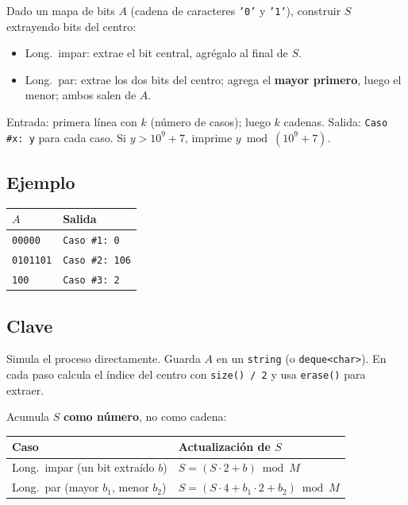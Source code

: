 \documentclass[12pt, oneside]{article}
\begin{document}
Dado un mapa de bits $A$ (cadena de caracteres \texttt{'0'} y \texttt{'1'}),
construir $S$ extrayendo bits del centro:

\begin{itemize}
  \item Long.\ impar: extrae el bit central, agrégalo al final de $S$.
  \item Long.\ par: extrae los dos bits del centro; agrega el \textbf{mayor
        primero}, luego el menor; ambos salen de $A$.
\end{itemize}

Entrada: primera línea con $k$ (número de casos); luego $k$ cadenas.
Salida: \texttt{Caso \#x: y} para cada caso.  Si $y > 10^9+7$, imprime
$y \bmod (10^9+7)$.

\subsection{Ejemplo}

\begin{center}
\begin{tabular}{ll}
  \toprule
  $A$ & Salida \\
  \midrule
  \texttt{00000}   & \texttt{Caso \#1: 0} \\
  \texttt{0101101} & \texttt{Caso \#2: 106} \\
  \texttt{100}     & \texttt{Caso \#3: 2} \\
  \bottomrule
\end{tabular}
\end{center}

\subsection{Clave}

Simula el proceso directamente.  Guarda $A$ en un \texttt{string} (o
\texttt{deque<char>}).  En cada paso calcula el índice del centro con
\texttt{size() / 2} y usa \texttt{erase()} para extraer.

Acumula $S$ \textbf{como número}, no como cadena:

\begin{center}
\begin{tabular}{ll}
  \toprule
  \textbf{Caso} & \textbf{Actualización de $S$} \\
  \midrule
  Long.\ impar (un bit extraído $b$)   & $S = (S \cdot 2 + b) \bmod M$ \\
  Long.\ par (mayor $b_1$, menor $b_2$) & $S = (S \cdot 4 + b_1 \cdot 2 + b_2) \bmod M$ \\
  \bottomrule
\end{tabular}
\end{center}
\end{document}
